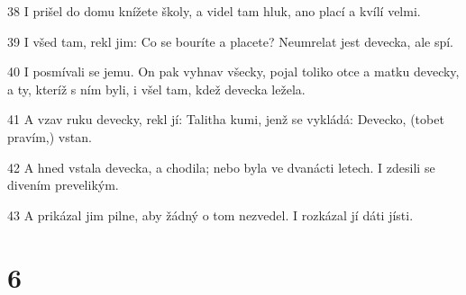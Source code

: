 \par 38 I prišel do domu knížete školy, a videl tam hluk, ano plací a kvílí velmi.
\par 39 I všed tam, rekl jim: Co se bouríte a placete? Neumrelat jest devecka, ale spí.
\par 40 I posmívali se jemu. On pak vyhnav všecky, pojal toliko otce a matku devecky, a ty, kteríž s ním byli, i všel tam, kdež devecka ležela.
\par 41 A vzav ruku devecky, rekl jí: Talitha kumi, jenž se vykládá: Devecko, (tobet pravím,) vstan.
\par 42 A hned vstala devecka, a chodila; nebo byla ve dvanácti letech. I zdesili se divením prevelikým.
\par 43 A prikázal jim pilne, aby žádný o tom nezvedel. I rozkázal jí dáti jísti.

\chapter{6}

